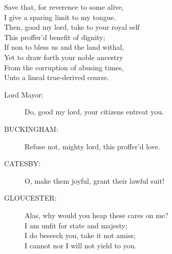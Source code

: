 \documentclass{article}
\begin{document}
\begin{description}
\hspace{1pt}Save that, for reverence to some alive,\\
\hspace{1pt}I give a sparing limit to my tongue.\\
\hspace{1pt}Then, good my lord, take to your royal self\\
\hspace{1pt}This proffer'd benefit of dignity;\\
\hspace{1pt}If non to bless us and the land withal,\\
\hspace{1pt}Yet to draw forth your noble ancestry\\
\hspace{1pt}From the corruption of abusing times,\\
\hspace{1pt}Unto a lineal true-derived course.\\
\end{description}
\begin{description}
\item[Lord Mayor:] 
\hspace{1pt}Do, good my lord, your citizens entreat you.\\
\end{description}
\begin{description}
\item[BUCKINGHAM:] 
\hspace{1pt}Refuse not, mighty lord, this proffer'd love.\\
\end{description}
\begin{description}
\item[CATESBY:] 
\hspace{1pt}O, make them joyful, grant their lawful suit!\\
\end{description}
\begin{description}
\item[GLOUCESTER:] 
\hspace{1pt}Alas, why would you heap these cares on me?\\
\hspace{1pt}I am unfit for state and majesty;\\
\hspace{1pt}I do beseech you, take it not amiss;\\
\hspace{1pt}I cannot nor I will not yield to you.\\
\end{description}
\end{document}
